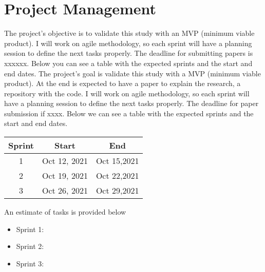 \section{Project Management}
 The project’s objective is to validate this study with an MVP (minimum viable product). I will work on agile methodology, so each sprint will have a planning session to define the next tasks properly. The deadline for submitting papers is xxxxxx. Below you can see a table with the expected sprints and the start and end dates. The project’s goal is validate this study with a MVP (minimum viable product). At the end is expected to have a paper to explain the research, a repository with the code. I will work on agile methodology, so each sprint will have a planning session to define the next tasks properly. The deadline for paper submission if
 xxxx. Below we can see a table with the expected sprints and the start and end dates.
 
\begin{table}[h]
\centering
\label{tab:tabela1}
\begin{adjustbox}{max width=\textwidth}
\begin{tabular}{|c|c|c|}
\hline
Sprint & Start & End \\ \hline\hline
1                          & Oct 12, 2021                    & Oct 15,2021                   \\
2                          & Oct 19, 2021                    & Oct 22,2021                   \\
3                          & Oct 26, 2021                    & Oct 29,2021                    \\
\hline
\end{tabular}
\end{adjustbox}
\end{table}
An estimate of tasks is provided below

\begin{itemize}
  \item Sprint 1:
  \item Sprint 2:
  \item Sprint 3:
\end{itemize}


